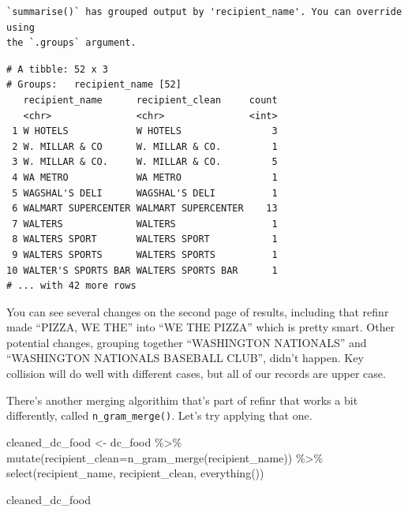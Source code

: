 \documentclass[
  letterpaper,
  DIV=11,
  numbers=noendperiod]{scrreprt}
\newenvironment{Shaded}{\begin{snugshade}}{\end{snugshade}}
\newcommand{\AttributeTok}[1]{\textcolor[rgb]{0.40,0.45,0.13}{#1}}
\newcommand{\FunctionTok}[1]{\textcolor[rgb]{0.28,0.35,0.67}{#1}}
\newcommand{\NormalTok}[1]{\textcolor[rgb]{0.00,0.23,0.31}{#1}}
\newcommand{\OtherTok}[1]{\textcolor[rgb]{0.00,0.23,0.31}{#1}}
\newcommand{\SpecialCharTok}[1]{\textcolor[rgb]{0.37,0.37,0.37}{#1}}
\begin{document}
\begin{verbatim}
`summarise()` has grouped output by 'recipient_name'. You can override using
the `.groups` argument.
\end{verbatim}

\begin{verbatim}
# A tibble: 52 x 3
# Groups:   recipient_name [52]
   recipient_name      recipient_clean     count
   <chr>               <chr>               <int>
 1 W HOTELS            W HOTELS                3
 2 W. MILLAR & CO      W. MILLAR & CO.         1
 3 W. MILLAR & CO.     W. MILLAR & CO.         5
 4 WA METRO            WA METRO                1
 5 WAGSHAL'S DELI      WAGSHAL'S DELI          1
 6 WALMART SUPERCENTER WALMART SUPERCENTER    13
 7 WALTERS             WALTERS                 1
 8 WALTERS SPORT       WALTERS SPORT           1
 9 WALTERS SPORTS      WALTERS SPORTS          1
10 WALTER'S SPORTS BAR WALTERS SPORTS BAR      1
# ... with 42 more rows
\end{verbatim}

You can see several changes on the second page of results, including
that refinr made ``PIZZA, WE THE'' into ``WE THE PIZZA'' which is pretty
smart. Other potential changes, grouping together ``WASHINGTON
NATIONALS'' and ``WASHINGTON NATIONALS BASEBALL CLUB'', didn't happen.
Key collision will do well with different cases, but all of our records
are upper case.

There's another merging algorithim that's part of refinr that works a
bit differently, called \texttt{n\_gram\_merge()}. Let's try applying
that one.

\begin{Shaded}
\begin{Highlighting}[]
\NormalTok{cleaned\_dc\_food }\OtherTok{\textless{}{-}}\NormalTok{ dc\_food }\SpecialCharTok{\%\textgreater{}\%}
  \FunctionTok{mutate}\NormalTok{(}\AttributeTok{recipient\_clean=}\FunctionTok{n\_gram\_merge}\NormalTok{(recipient\_name)) }\SpecialCharTok{\%\textgreater{}\%}
  \FunctionTok{select}\NormalTok{(recipient\_name, recipient\_clean, }\FunctionTok{everything}\NormalTok{())}

\NormalTok{cleaned\_dc\_food}
\end{Highlighting}
\end{Shaded}
\end{document}
